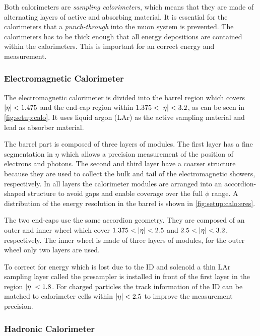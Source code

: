 Both calorimeters are \emph{sampling calorimeters}, which means that they are made of
alternating layers of active and absorbing material.
It is essential for the calorimeters that a \emph{punch-through} into the muon system is prevented.
The calorimeters has to be thick enough that all energy depositions are contained within the calorimeters.
This is important for an correct energy and \etmiss{} measurement.

\subsubsection{Electromagnetic Calorimeter}\label{subsub:setup:ecal}

The electromagnetic calorimeter is divided into the barrel region which covers $\left|\eta\right| < 1.475$ and the
end-cap region within $1.375 < \left|\eta\right| < 3.2$, as can be seen in \cref{fig:setup:calo}.
It uses liquid argon (LAr) as the active sampling material and lead as absorber material.

The barrel part is composed of three layers of modules.
The first layer has a fine segmentation in $\eta$ which allows a precision measurement of the position
of electrons and photons.
The second and third layer have a coarser structure because they are used to collect the bulk and tail of
the electromagnetic showers, respectively.
In all layers the calorimeter modules are arranged into an accordion-shaped structure to avoid gaps
and enable coverage over the full $\phi$ range.
A distribution of the energy resolution in the barrel is shown in \cref{fig:setup:calo:eres}.

The two end-caps use the same accordion geometry.
They are composed of an outer and inner wheel which cover $1.375 < \left|\eta\right| < 2.5$ and $2.5 < \left|\eta\right| < 3.2$, respectively.
The inner wheel is made of three layers of modules, for the outer wheel only two layers are used.

To correct for energy which is lost due to the ID and solenoid a thin LAr sampling layer called the presampler is installed
in front of the first layer in the region $\left|\eta\right| < 1.8$.
For charged particles the track information of the ID can be matched to calorimeter cells within $\left|\eta\right| < 2.5$ to improve
the measurement precision.

\subsubsection{Hadronic Calorimeter}\label{subsub:setup:hcal}

